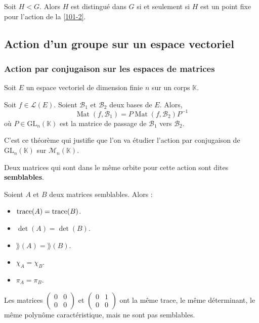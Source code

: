 	\begin{proposition}
		Soit $H < G$. Alors $H$ est distingué dans $G$ si et seulement si $H$ est un point fixe pour l'action de la \cref{101-2}.
	\end{proposition}

	\subsection{Action d'un groupe sur un espace vectoriel}

	\subsubsection{Action par conjugaison sur les espaces de matrices}

	Soit $E$ un espace vectoriel de dimension finie $n$ sur un corps $\mathbb{K}$.


	\begin{theorem}
		Soit $f \in \mathcal{L}(E)$. Soient $\mathcal{B}_1$ et $\mathcal{B}_2$ deux bases de $E$. Alors,
		\[ \operatorname{Mat}(f, \mathcal{B}_1) = P \operatorname{Mat}(f, \mathcal{B}_2) P^{-1} \]
		où $P \in \mathrm{GL}_n(\mathbb{K})$ est la matrice de passage de $\mathcal{B}_1$ vers $\mathcal{B}_2$.
	\end{theorem}

	C'est ce théorème qui justifie que l'on va étudier l'action par conjugaison de $\mathrm{GL}_n(\mathbb{K})$ sur $\mathcal{M}_n(\mathbb{K})$.

	\begin{definition}
		Deux matrices qui sont dans le même orbite pour cette action sont dites \textbf{semblables}.
	\end{definition}

	\begin{theorem}
		Soient $A$ et $B$ deux matrices semblables. Alors :
		\begin{itemize}
			\item $\operatorname{trace}(A) = \operatorname{trace}(B)$.
			\item $\det(A) = \det(B)$.
			\item $\rang(A) = \rang(B)$.
			\item $\chi_A = \chi_B$.
			\item $\pi_A = \pi_B$.
		\end{itemize}
	\end{theorem}

	\begin{cexample}
		Les matrices $\begin{pmatrix} 0 & 0 \\ 0 & 0\end{pmatrix}$ et $\begin{pmatrix} 0 & 1 \\ 0 & 0\end{pmatrix}$ ont la même trace, le même déterminant, le même polynôme caractéristique, mais ne sont pas semblables.
	\end{cexample}

